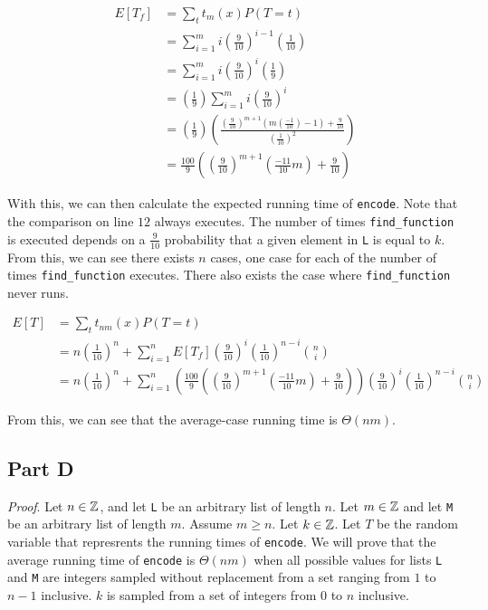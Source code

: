 \documentclass{article}
\begin{document}
\begin{align*}
    E[T_f] & = \sum_t t_m(x) P(T=t)                                                                               \\
           & = \sum^m_{i=1} i (\frac{9}{10})^{i-1} (\frac{1}{10})                                                 \\
           & = \sum^m_{i=1} i (\frac{9}{10})^{i} (\frac{1}{9})                                                    \\
           & = (\frac{1}{9}) \sum^m_{i=1} i (\frac{9}{10})^{i}                                                    \\
           & = (\frac{1}{9}) (\frac{(\frac{9}{10})^{m+1} (m(\frac{-1}{10})- 1) + \frac{9}{10}}{(\frac{1}{10})^2}) \\
           & = \frac{100}{9}((\frac{9}{10})^{m+1} (\frac{-11}{10}m) + \frac{9}{10})
\end{align*}

With this, we can then calculate the expected running time of \verb|encode|. Note that the comparison on line $12$ always executes. The number of times \verb|find_function| is executed depends on a $\frac{9}{10}$ probability that a given element in \verb|L| is equal to $k$. From this, we can see there exists $n$ cases, one case for each of the number of times \verb|find_function| executes. There also exists the case where \verb|find_function| never runs.

\begin{align*}
    E[T] & = \sum_t t_{nm}(x) P(T=t)                                                                                                                                    \\
         & = n(\frac{1}{10})^n + \sum^n_{i=1} E[T_f] (\frac{9}{10})^i(\frac{1}{10})^{n-i} {n \choose i}                                                                 \\
         & = n(\frac{1}{10})^n + \sum^n_{i=1} (\frac{100}{9}((\frac{9}{10})^{m+1} (\frac{-11}{10}m) + \frac{9}{10})) (\frac{9}{10})^i(\frac{1}{10})^{n-i} {n \choose i}
\end{align*}

From this, we can see that the average-case running time is $\Theta(nm)$.

\subsection*{Part D}

\textit{Proof}. Let $n \in \mathbb Z$, and let \verb|L| be an arbitrary list of length $n$. Let $m \in \mathbb Z$ and let \verb|M| be an arbitrary list of length $m$. Assume $m \geq n$. Let $k \in \mathbb Z$. Let $T$ be the random variable that represrents the running times of \verb|encode|. We will prove that the average running time of \verb|encode| is $\Theta(nm)$ when all possible values for lists \verb|L| and \verb|M| are integers sampled without replacement from a set ranging from $1$ to $n-1$ inclusive. $k$ is sampled from a set of integers from $0$ to $n$ inclusive.
\end{document}
